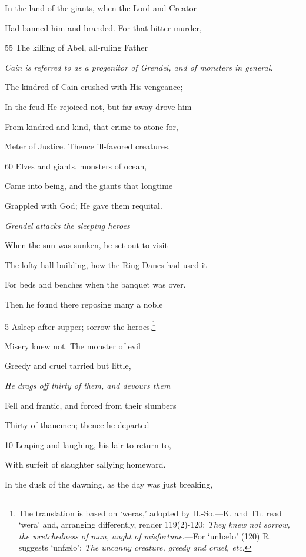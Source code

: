 In the land of the giants, when the Lord and Creator

Had banned him and branded. For that bitter murder,

55
The killing of Abel, all-ruling Father

\emph{Cain is referred to
as a progenitor of
Grendel, and of
monsters in general.}

The kindred of Cain crushed with His vengeance;

In the feud He rejoiced not, but far away drove him

From kindred and kind, that crime to atone for,

Meter of Justice. Thence ill-favored creatures,

60
Elves and giants, monsters of ocean,

Came into being, and the giants that longtime

Grappled with God; He gave them requital.



\emph{Grendel attacks the
sleeping heroes}

When the sun was sunken, he set out to visit

The lofty hall-building, how the Ring-Danes had used it

For beds and benches when the banquet was over.

Then he found there reposing many a noble

5
Asleep after supper; sorrow the heroes,\footnote{The translation is based on ‘weras,’ adopted by H.-So.—K. and Th.
read ‘wera’ and, arranging differently, render 119(2)-120: \emph{They knew not
sorrow, the wretchedness of man, aught of misfortune}.—For ‘unhælo’ (120)
R. suggests ‘unfælo’: \emph{The uncanny creature, greedy and cruel, etc}.}

Misery knew not. The monster of evil

Greedy and cruel tarried but little,

\emph{He drags off thirty
of them, and devours
them}

Fell and frantic, and forced from their slumbers

Thirty of thanemen; thence he departed

10
Leaping and laughing, his lair to return to,

With surfeit of slaughter sallying homeward.

In the dusk of the dawning, as the day was just breaking,

